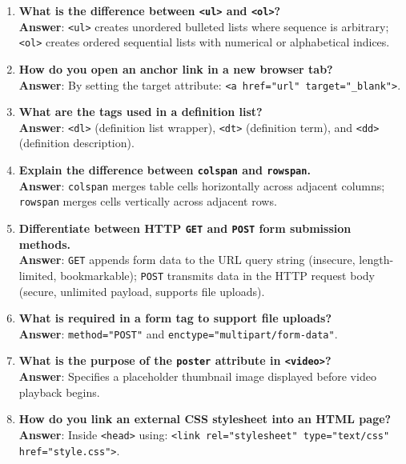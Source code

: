 \begin{enumerate}[leftmargin=1.5em]
    \item \textbf{What is the difference between \texttt{<ul>} and \texttt{<ol>}?}\\
    \textbf{Answer}: \texttt{<ul>} creates unordered bulleted lists where sequence is arbitrary; \texttt{<ol>} creates ordered sequential lists with numerical or alphabetical indices.

    \item \textbf{How do you open an anchor link in a new browser tab?}\\
    \textbf{Answer}: By setting the target attribute: \texttt{<a href="url" target="\_blank">}.

    \item \textbf{What are the tags used in a definition list?}\\
    \textbf{Answer}: \texttt{<dl>} (definition list wrapper), \texttt{<dt>} (definition term), and \texttt{<dd>} (definition description).

    \item \textbf{Explain the difference between \texttt{colspan} and \texttt{rowspan}.}\\
    \textbf{Answer}: \texttt{colspan} merges table cells horizontally across adjacent columns; \texttt{rowspan} merges cells vertically across adjacent rows.

    \item \textbf{Differentiate between HTTP \texttt{GET} and \texttt{POST} form submission methods.}\\
    \textbf{Answer}: \texttt{GET} appends form data to the URL query string (insecure, length-limited, bookmarkable); \texttt{POST} transmits data in the HTTP request body (secure, unlimited payload, supports file uploads).

    \item \textbf{What is required in a form tag to support file uploads?}\\
    \textbf{Answer}: \texttt{method="POST"} and \texttt{enctype="multipart/form-data"}.

    \item \textbf{What is the purpose of the \texttt{poster} attribute in \texttt{<video>}?}\\
    \textbf{Answer}: Specifies a placeholder thumbnail image displayed before video playback begins.

    \item \textbf{How do you link an external CSS stylesheet into an HTML page?}\\
    \textbf{Answer}: Inside \texttt{<head>} using: \texttt{<link rel="stylesheet" type="text/css" href="style.css">}.


\end{enumerate}
